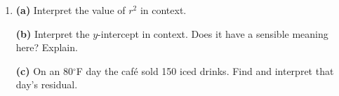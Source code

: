 \documentclass[12pt]{article}
\begin{document}
\begin{enumerate}[leftmargin=1.9em, resume]

  \boxguard[14]
  \item \textbf{(a)} Interpret the value of $r^2$ in context.\\[2pt]

        \vspace{2pt}
        \boxguard[14]
        \textbf{(b)} Interpret the $y$-intercept in context. Does it have a sensible meaning
        here? Explain.\\[2pt]

        \vspace{2pt}
        \boxguard[14]
        \textbf{(c)} On an 80$^\circ$F day the caf\'e sold 150 iced drinks. Find and interpret
        that day's residual.\\[2pt]

\end{enumerate}
\end{document}
